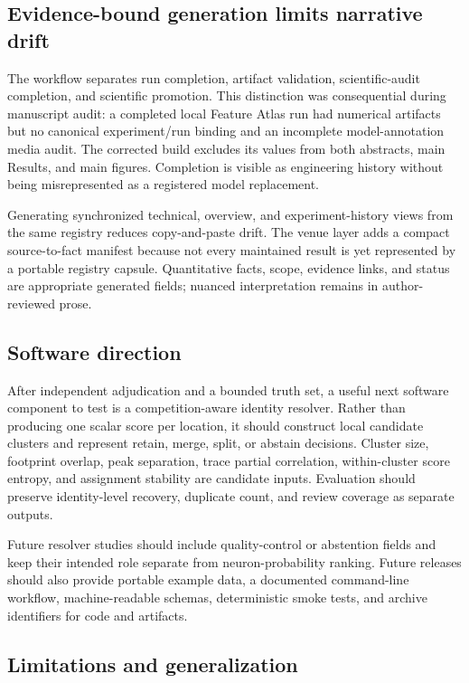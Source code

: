 \subsection{Evidence-bound generation limits narrative drift}

The workflow separates run completion, artifact validation, scientific-audit
completion, and scientific promotion. This distinction was consequential during
manuscript audit: a completed local Feature Atlas run had numerical artifacts but
no canonical experiment/run binding and an incomplete model-annotation media
audit. The corrected build excludes its values from both abstracts, main Results,
and main figures. Completion is visible as engineering history without being
misrepresented as a registered model replacement.

Generating synchronized technical, overview, and experiment-history views from
the same registry reduces copy-and-paste drift. The venue layer adds a compact
source-to-fact manifest because not every maintained result is yet represented
by a portable registry capsule. Quantitative facts, scope, evidence links, and
status are appropriate generated fields; nuanced interpretation remains in
author-reviewed prose.

\subsection{Software direction}

After independent adjudication and a bounded truth set, a useful next software
component to test is a competition-aware identity resolver.
Rather than producing one scalar score per location, it should construct local
candidate clusters and represent retain, merge, split, or abstain decisions.
Cluster size, footprint overlap, peak separation, trace partial correlation,
within-cluster score entropy, and assignment stability are candidate inputs.
Evaluation should preserve identity-level recovery, duplicate count, and review
coverage as separate outputs.

Future resolver studies should include quality-control or abstention fields and
keep their intended role separate from neuron-probability ranking. Future
releases should also provide portable example data, a documented command-line
workflow, machine-readable schemas, deterministic smoke tests, and archive
identifiers for code and artifacts.

\subsection{Limitations and generalization}

